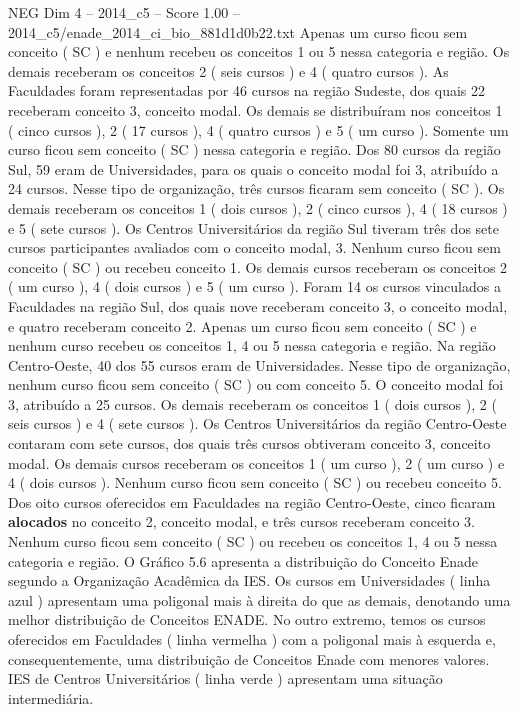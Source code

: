 \begin{textsample}{NEG Dim 4 – 2014\_c5 – Score 1.00 – 2014\_c5/enade\_2014\_ci\_bio\_881d1d0b22.txt}
Apenas um curso ficou sem conceito ( SC ) e nenhum recebeu os conceitos 1 ou 5 nessa categoria e região.
Os demais receberam os conceitos 2 ( seis cursos ) e 4 ( quatro cursos ).
As Faculdades foram representadas por 46 cursos na região Sudeste, dos quais 22 receberam conceito 3, conceito modal.
Os demais se distribuíram nos conceitos 1 ( cinco cursos ), 2 ( 17 cursos ), 4 ( quatro cursos ) e 5 ( um curso ).
Somente um curso ficou sem conceito ( SC ) nessa categoria e região.
Dos 80 cursos da região Sul, 59 eram de Universidades, para os quais o conceito modal foi 3, atribuído a 24 cursos.
Nesse tipo de organização, três cursos ficaram sem conceito ( SC ).
Os demais receberam os conceitos 1 ( dois cursos ), 2 ( cinco cursos ), 4 ( 18 cursos ) e 5 ( sete cursos ).
Os Centros Universitários da região Sul tiveram três dos sete cursos participantes avaliados com o conceito modal, 3.
Nenhum curso ficou sem conceito ( SC ) ou recebeu conceito 1.
Os demais cursos receberam os conceitos 2 ( um curso ), 4 ( dois cursos ) e 5 ( um curso ).
Foram 14 os cursos vinculados a Faculdades na região Sul, dos quais nove receberam conceito 3, o conceito modal, e quatro receberam conceito 2.
Apenas um curso ficou sem conceito ( SC ) e nenhum curso recebeu os conceitos 1, 4 ou 5 nessa categoria e região.
Na região Centro-Oeste, 40 dos 55 cursos eram de Universidades.
Nesse tipo de organização, nenhum curso ficou sem conceito ( SC ) ou com conceito 5.
O conceito modal foi 3, atribuído a 25 cursos.
Os demais receberam os conceitos 1 ( dois cursos ), 2 ( seis cursos ) e 4 ( sete cursos ).
Os Centros Universitários da região Centro-Oeste contaram com sete cursos, dos quais três cursos obtiveram conceito 3, conceito modal.
Os demais cursos receberam os conceitos 1 ( um curso ), 2 ( um curso ) e 4 ( dois cursos ).
Nenhum curso ficou sem conceito ( SC ) ou recebeu conceito 5.
Dos oito cursos oferecidos em Faculdades na região Centro-Oeste, cinco ficaram \textbf{alocados} no conceito 2, conceito modal, e três cursos receberam conceito 3.
Nenhum curso ficou sem conceito ( SC ) ou recebeu os conceitos 1, 4 ou 5 nessa categoria e região.
O Gráfico 5.6 apresenta a distribuição do Conceito Enade segundo a Organização Acadêmica da IES.
Os cursos em Universidades ( linha azul ) apresentam uma poligonal mais à direita do que as demais, denotando uma melhor distribuição de Conceitos ENADE.
No outro extremo, temos os cursos oferecidos em Faculdades ( linha vermelha ) com a poligonal mais à esquerda e, consequentemente, uma distribuição de Conceitos Enade com menores valores.
IES de Centros Universitários ( linha verde ) apresentam uma situação intermediária.

\end{textsample}
